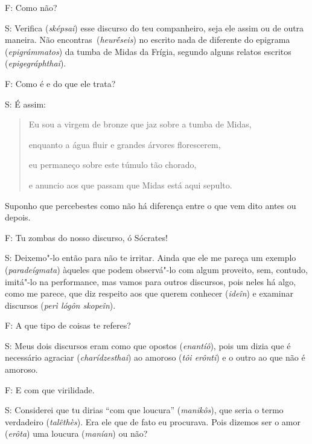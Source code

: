  

F: Como não?

 

S: Verifica (\emph{sképsai}) esse discurso do teu companheiro, seja ele
assim ou de outra maneira. Não encontras\emph{~}(\emph{heurḗseis}) no
escrito nada de diferente do epigrama (\emph{epigrámmatos}) da tumba de
Midas da Frígia, segundo alguns relatos escritos
(\emph{epigegráphthai}).

 

F: Como é e do que ele trata?

 

S: É assim:

 

\begin{quote}
Eu sou a virgem de bronze que jaz sobre a tumba de Midas,

enquanto a água fluir e grandes árvores florescerem,

eu permaneço sobre este túmulo tão chorado,

e anuncio aos que passam que Midas está aqui sepulto.
\end{quote}

 

Suponho que percebestes como não há diferença entre o que vem dito antes
ou depois.

\bekker{[264e]} F: Tu zombas do nosso discurso, ó Sócrates!

 

S: Deixemo"-lo então para não te irritar. Ainda que ele me pareça um
exemplo (\emph{paradeígmata}) àqueles que podem observá"-lo com algum
proveito, sem, contudo, imitá"-lo na performance, mas vamos para outros
discursos, pois neles há algo, como me parece, que diz respeito aos que
querem conhecer (\emph{ideîn}) e examinar discursos (\emph{perì lógôn
skopeîn}).

 

\bekker{[265a]} F: A que tipo de coisas te referes?

 

S: Meus dois discursos eram como que opostos (\emph{enantíô}), pois um
dizia que é necessário agraciar (\emph{charídzesthai}) ao amoroso
(\emph{tôi erônti}) e o outro ao que não é amoroso.

 

F: E com que virilidade.

 

S: Considerei que tu dirias ``com que loucura'' (\emph{manikôs}), que
seria o termo verdadeiro (\emph{talêthès}). Era ele que de fato eu
procurava. Pois dizemos ser o amor (\emph{erôta}) uma loucura
(\emph{manían}) ou não?

